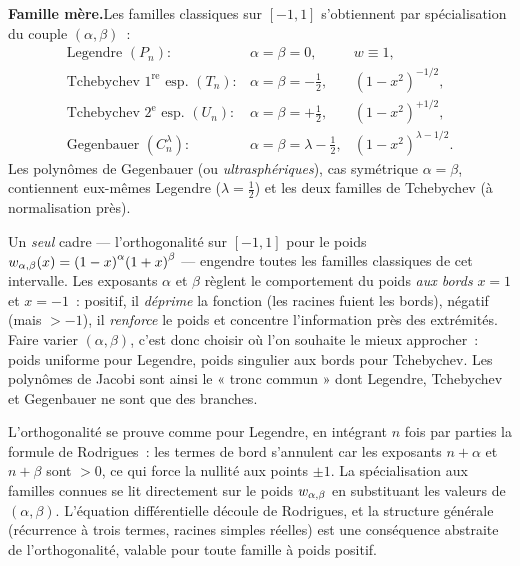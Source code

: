 \begin{tcolorbox}[thmbox]
  \medskip
  \textbf{Famille mère.}\enspace Les familles classiques sur $[-1,1]$
  s'obtiennent par spécialisation du couple $(\alpha,\beta)$~:
  \[
    \begin{array}{lll}
      \text{Legendre } (P_n): & \alpha=\beta=0, & w\equiv 1,\\[2pt]
      \text{Tchebychev } 1^{\text{re}}\text{ esp. } (T_n):
        & \alpha=\beta=-\tfrac12, & {(1-x^2)}^{-1/2},\\[2pt]
      \text{Tchebychev } 2^{\text{e}}\text{ esp. } (U_n):
        & \alpha=\beta=+\tfrac12, & {(1-x^2)}^{+1/2},\\[2pt]
      \text{Gegenbauer } (C_n^{\lambda}):
        & \alpha=\beta=\lambda-\tfrac12, & {(1-x^2)}^{\lambda-1/2}.
    \end{array}
  \]
  Les polynômes de Gegenbauer (ou
  \emph{ultrasphériques}), cas symétrique
  $\alpha=\beta$, contiennent eux-mêmes Legendre ($\lambda=\tfrac12$) et les
  deux familles de Tchebychev (à normalisation près).
\end{tcolorbox}

\begin{significationintuitive}
Un \emph{seul} cadre — l'orthogonalité sur $[-1,1]$ pour le poids
$w_{\alpha,\beta}(x)={(1-x)}^\alpha{(1+x)}^\beta$ — engendre toutes les familles
classiques de cet intervalle. Les exposants $\alpha$ et $\beta$ règlent le
comportement du poids \emph{aux bords} $x=1$ et $x=-1$~: positif, il
\emph{déprime} la fonction (les racines fuient les bords), négatif (mais
$>-1$), il \emph{renforce} le poids et concentre l'information près des
extrémités. Faire varier $(\alpha,\beta)$, c'est donc choisir où l'on
souhaite le mieux approcher~: poids uniforme pour Legendre, poids
singulier aux bords pour Tchebychev. Les polynômes de Jacobi sont ainsi
le « tronc commun » dont Legendre, Tchebychev et Gegenbauer ne sont que
des branches.
\end{significationintuitive}

\decsep{}


\begin{ideepreuve}
L'orthogonalité se prouve comme pour Legendre, en intégrant $n$ fois par
parties la formule de Rodrigues~: les termes de bord s'annulent car les
exposants $n+\alpha$ et $n+\beta$ sont $>0$, ce qui force la nullité aux
points $\pm 1$. La spécialisation aux familles connues se lit directement
sur le poids $w_{\alpha,\beta}$ en substituant les valeurs de $(\alpha,\beta)$.
L'équation différentielle découle de Rodrigues, et la structure générale
(récurrence à trois termes, racines simples réelles) est une conséquence
abstraite de l'orthogonalité, valable pour toute famille à poids positif.
\end{ideepreuve}

